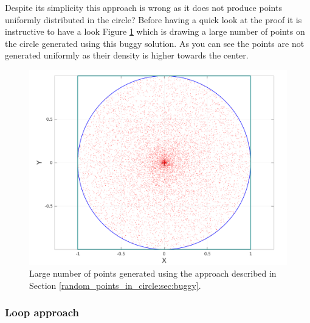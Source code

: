 Despite its simplicity this approach is wrong as it does not produce points uniformly distributed in the circle? Before having a quick look at the proof it is instructive to have a look Figure \ref{fig:random_points_in_cirle:buggy} which is drawing a large number of points on the circle generated using this buggy solution. As you can see the points are not generated uniformly as their density is higher towards the center. 

\begin{figure}
	\label{fig:random_points_in_cirle:buggy}
	\centering
	\includegraphics[scale=0.3]{sources/random_points_in_circle/images/buggy_points}
	\caption{Large number of points generated using the approach described in Section \ref{random_points_in_circle:sec:buggy}.}
\end{figure}

\subsubsection{Loop approach}
\label{random_points_in_circle:sec:loop}

